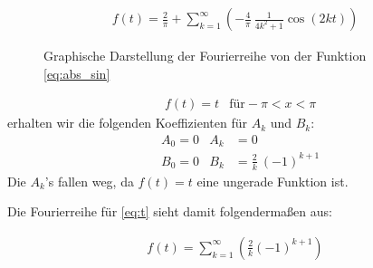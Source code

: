 
    \begin{align}
        f(t)=\frac{2}{\pi}+\sum_{k=1}^{\infty} \left(-\frac{4}{\pi} \:\frac{1}{4k^2+1} \cos(2kt)\right)
    \end{align}
    \newpage
    \begin{figure}[h]
         \centering
           \vspace{-1.5em}
         \caption{Graphische Darstellung der Fourierreihe von der Funktion \eqref{eq:abs_sin} \protect\footnotemark}
         \label{fig:sc_sin} 
    \end{figure}

    \begin{align}
        &f(t) = t &\text{für} -\pi < x < \pi \label{eq:t}
    \end{align}
    erhalten wir die folgenden Koeffizienten für $A_k$ und $B_k$:
    \begin{align*}
        &A_0 = 0 &A_k &= 0\\
        &B_0 = 0 &B_k &= \frac{2}{k}\:(-1)^{k+1}
    \end{align*}
    Die $A_k$'s fallen weg, da $f(t)=t$ eine ungerade Funktion ist.

    Die Fourierreihe für \eqref{eq:t} sieht damit folgendermaßen aus:

    \begin{align}
        f(t)= \sum_{k=1}^{\infty} \left(\frac{2}{k} (-1)^{k+1}\right)
    \end{align}
    \newpage

